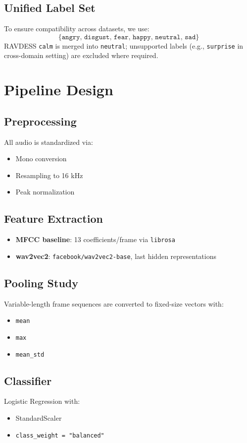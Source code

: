 \documentclass[11pt,a4paper]{article}
\begin{document}
\subsection{Unified Label Set}
To ensure compatibility across datasets, we use:
\[
\{\texttt{angry, disgust, fear, happy, neutral, sad}\}
\]
RAVDESS \texttt{calm} is merged into \texttt{neutral}; unsupported labels (e.g., \texttt{surprise} in cross-domain setting) are excluded where required.

\section{Pipeline Design}
\subsection{Preprocessing}
All audio is standardized via:
\begin{itemize}
    \item Mono conversion
    \item Resampling to 16 kHz
    \item Peak normalization
\end{itemize}

\subsection{Feature Extraction}
\begin{itemize}
    \item \textbf{MFCC baseline}: 13 coefficients/frame via \texttt{librosa}
    \item \textbf{wav2vec2}: \texttt{facebook/wav2vec2-base}, last hidden representations
\end{itemize}

\subsection{Pooling Study}
Variable-length frame sequences are converted to fixed-size vectors with:
\begin{itemize}
    \item \texttt{mean}
    \item \texttt{max}
    \item \texttt{mean\_std}
\end{itemize}

\subsection{Classifier}
Logistic Regression with:
\begin{itemize}
    \item StandardScaler
    \item \texttt{class\_weight = "balanced"}
\end{itemize}
\end{document}
